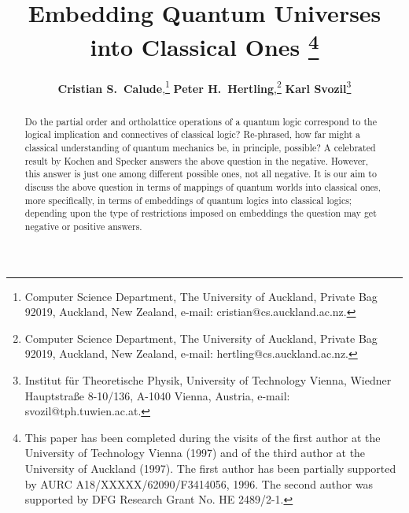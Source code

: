 
\RequirePackage{times}
\RequirePackage{mathptm}

\oddsidemargin 0in
\evensidemargin 0in
\textwidth5.9in
\topmargin -0.5in

\newcommand{\s}{\rightarrow}

%
%


\sloppy








\title{{\huge {\bf Embedding Quantum Universes into Classical Ones}}
\thanks{This paper has been completed
during the visits of the first author at the University of Technology
Vienna (1997) and of the third   author at the University of Auckland (1997).
The first   author has been
partially supported by AURC A18/XXXXX/62090/F3414056, 1996. The
second author was supported by DFG Research Grant No. HE 2489/2-1.}}
\author{{\large {\bf Cristian S.\  Calude},}\thanks{Computer Science Department,
The University of Auckland, Private Bag 92019, Auckland, New Zealand,
 e-mail: cristian@cs.auckland.ac.nz.} \quad
{\large {\bf Peter H.\ Hertling},}\thanks{Computer Science Department,
The University of Auckland, Private Bag 92019, Auckland, New Zealand,
e-mail: hertling@cs.auckland.ac.nz.}  \quad
{\large {\bf Karl  Svozil}}\thanks{Institut f\"ur Theoretische Physik,
University of Technology Vienna,
Wiedner Hauptstra\ss e 8-10/136,  A-1040 Vienna, Austria,
e-mail: svozil@tph.tuwien.ac.at.}}


\date{ }
\maketitle

\thispagestyle{empty}

\begin{abstract}
Do the partial order and ortholattice operations of a quantum logic correspond
to the logical implication and connectives of classical logic?  Re-phrased,
how far might a classical understanding of quantum mechanics
be, in principle, possible?  A celebrated result
by Kochen and Specker answers the above question in the negative.
However, this answer is just one among different possible ones, not all
negative.
It is our aim  to discuss the above question in terms of mappings of quantum
worlds into classical ones, more specifically, in terms of embeddings of
quantum logics
into classical logics; depending upon the type of restrictions imposed on
embeddings the question may get negative or positive answers.

\end{abstract}






